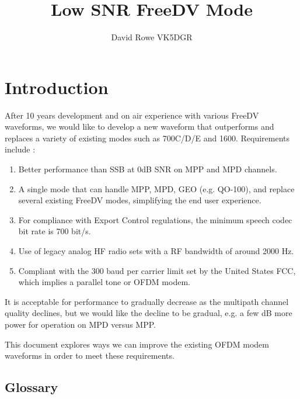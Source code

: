\documentclass{article}
\begin{document}
\title{Low SNR FreeDV Mode}
\author{David Rowe VK5DGR}
\maketitle

\section{Introduction}

After 10 years development and on air experience with various FreeDV waveforms, we would like to develop a new waveform that outperforms and replaces a variety of existing modes such as 700C/D/E and 1600.  Requirements include \cite{freedv-020}:
\begin{enumerate}
\item Better performance than SSB at 0dB SNR on MPP and MPD channels.
\item A single mode that can handle MPP, MPD, GEO (e.g. QO-100), and replace several existing FreeDV modes, simplifying the end user experience.
\item For compliance with Export Control regulations, the minimum speech codec bit rate is 700 bit/s.
\item Use of legacy analog HF radio sets with a RF bandwidth of around 2000 Hz.
\item Compliant with the 300 baud per carrier limit set by the United States FCC, which implies a parallel tone or OFDM modem. 
\end{enumerate}
It is acceptable for performance to gradually decrease as the multipath channel quality declines, but we would like the decline to be gradual, e.g. a few dB more power for operation on MPD versus MPP.

This document explores ways we can improve the existing OFDM modem waveforms in order to meet these requirements.

\clearpage

\subsection{Glossary}
\end{document}
